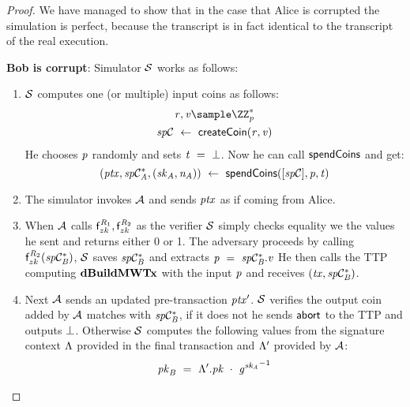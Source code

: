 \begin{proof}
    We have managed to show that in the case that Alice is corrupted the simulation is perfect, because the transcript is in fact identical to the transcript of the real execution.

    \textbf{Bob is corrupt}: Simulator $\mathcal{S}$ works as follows:
    \begin{enumerate}
        \item $\mathcal{S}$ computes one (or multiple) input coins as follows:
        \begin{gather*}
            \varBlindingFactor, \varValue \sample \cnstIntegersPrimeWithoutZero{\varPrime} \\
            \varSpendableCoin \opFunResult \procCreateCoin{\varBlindingFactor}{\varValue}
        \end{gather*}
        He chooses $\mathit{p}$ randomly and sets $\mathit{t} ~=~ \bot$.
        Now he can call $\mathsf{spendCoins}$ and get:
        \[ (\mathit{ptx}, \mathit{sp}\mathcal{C}_{\mathit{A}}^*, (\mathit{sk}_{\mathit{A}}, \mathit{\mathit{n}_{\mathit{A}}})) ~\leftarrow~ \mathsf{spendCoins}([\mathit{sp}\mathcal{C}],\mathit{p},\mathit{t}) \]
        \item The simulator invokes $\mathcal{A}$ and sends $\mathit{ptx}$ as if coming from Alice.
        \item When $\mathcal{A}$ calls $\mathsf{f}^{\mathit{R}_1}_{zk},\mathsf{f}^{\mathit{R}_2}_{zk}$  as the verifier $\mathcal{S}$ simply checks equality we the values he sent and returns either 0 or 1.
        The adversary proceeds by calling $\mathsf{f}^{\mathit{R}_2}_{zk}(\mathit{sp}\mathcal{C}_{\mathit{B}}^*)$, $\mathcal{S}$ saves $\mathit{sp}\mathcal{C}_{\mathit{B}}^*$ and extracts $\mathit{p} ~=~ \mathit{sp}\mathcal{C}_{\mathit{B}}^*.\mathit{v}$
        He then calls the TTP computing $\mathbf{dBuildMWTx}$ with the input $\mathit{p}$ and receives $(\mathit{tx}, \mathit{sp}\mathcal{C}_{\mathit{B}}^*)$.
        \item Next $\mathcal{A}$ sends an updated pre-transaction ${\mathit{ptx}}'$.
        $\mathcal{S}$ verifies the output coin added by $\mathcal{A}$ matches with $\mathit{sp}\mathcal{C}_{\mathit{B}}^*$, if it does not he sends $\mathsf{abort}$ to the TTP and outputs $\bot$.
        Otherwise $\mathcal{S}$ computes the following values from the signature context $\Lambda$ provided in the final transaction and ${\Lambda}'$ provided by $\mathcal{A}$:
        \begin{gather*}
            \varPubKeyBob \opEqNoQ \funStarAlt{\varSigContext}.\varPubKey \opAddPoint {\funGen{\varSecKeyAlice}}^{-1} \\

\end{gather*}
\end{enumerate}
\end{proof}
